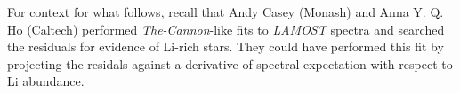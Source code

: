 \documentclass[12pt]{article}
\begin{document}
\raggedbottom\sloppy\sloppypar\frenchspacing

For context for what follows, recall that Andy Casey (Monash) and Anna
Y. Q. Ho (Caltech) performed \textsl{The-Cannon}-like fits to
\textsl{LAMOST} spectra and searched the residuals for evidence of
Li-rich stars. They could have performed this fit by projecting the
residals against a derivative of spectral expectation with respect
to Li abundance.
\end{document}

